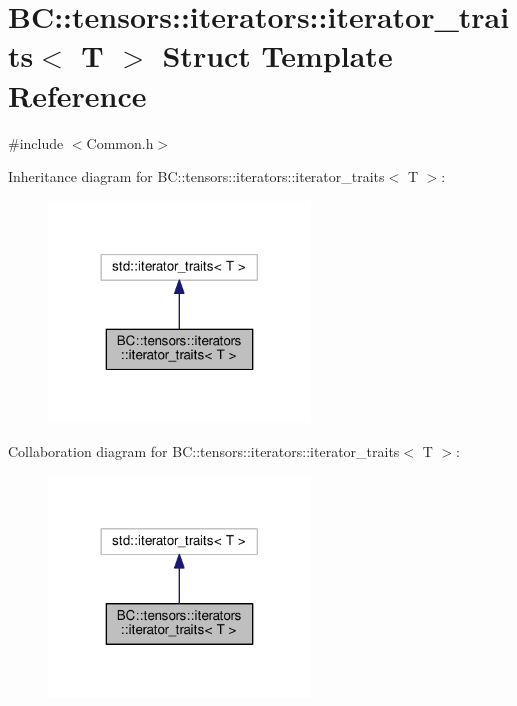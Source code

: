 \hypertarget{structBC_1_1tensors_1_1iterators_1_1iterator__traits}{}\section{BC\+:\+:tensors\+:\+:iterators\+:\+:iterator\+\_\+traits$<$ T $>$ Struct Template Reference}
\label{structBC_1_1tensors_1_1iterators_1_1iterator__traits}


{\ttfamily \#include $<$Common.\+h$>$}



Inheritance diagram for BC\+:\+:tensors\+:\+:iterators\+:\+:iterator\+\_\+traits$<$ T $>$\+:
\nopagebreak
\begin{figure}[H]
\begin{center}
\leavevmode
\includegraphics[width=197pt]{structBC_1_1tensors_1_1iterators_1_1iterator__traits__inherit__graph}
\end{center}
\end{figure}


Collaboration diagram for BC\+:\+:tensors\+:\+:iterators\+:\+:iterator\+\_\+traits$<$ T $>$\+:
\nopagebreak
\begin{figure}[H]
\begin{center}
\leavevmode
\includegraphics[width=197pt]{structBC_1_1tensors_1_1iterators_1_1iterator__traits__coll__graph}
\end{center}
\end{figure}
